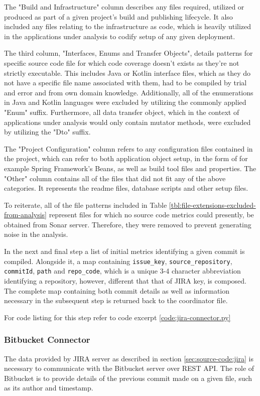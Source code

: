 The "Build and Infrastructure" column describes any files required, utilized or produced as part of a given project's build and publishing lifecycle. It also included any files relating to the infrastructure as code, which is heavily utilized in the applications under analysis to codify setup of any given deployment.

The third column, "Interfaces, Enums and Transfer Objects", details patterns for specific source code file for which code coverage doesn't exists as they're not strictly executable. This includes Java or Kotlin interface files, which as they do not have a specific file name associated with them, had to be compiled by trial and error and from own domain knowledge. Additionally, all of the enumerations in Java and Kotlin languages were excluded by utilizing the commonly applied "Enum" suffix. Furthermore, all data transfer object, which in the context of applications under analysis would only contain mutator methods, were excluded by utilizing the "Dto" suffix. 

The "Project Configuration" column refers to any configuration files contained in the project, which can refer to both application object setup, in the form of for example Spring Framework's Beans, as well as build tool files and properties. 
The "Other" column contains all of the files that did not fit any of the above categories. It represents the readme files, database scripts and other setup files.

To reiterate, all of the file patterns included in Table \ref{tbl:file-extensions-excluded-from-analysis} represent files for which no source code metrics could presently, be obtained from Sonar server. Therefore, they were removed to prevent generating noise in the analysis.
    
In the next and final step a list of initial metrics identifying a given commit is compiled. Alongside it, a map containing \texttt{issue\_key}, \texttt{source\_repository}, \texttt{commitId}, \texttt{path} and \texttt{repo\_code}, which is a unique 3-4 character abbreviation identifying a repository, however, different that that of JIRA key, is composed. The complete map containing both commit details as well as information necessary in the subsequent step is returned back to the coordinator file. 
    
For code listing for this step refer to code excerpt \ref{code:jira-connector.py}

\subsubsection{Bitbucket Connector}\label{sec:source-code:bitbucket}
The data provided by JIRA server as described in section \ref{sec:source-code:jira} is necessary to communicate with the Bitbucket server over REST API. The role of Bitbucket is to provide details of the previous commit made on a given file, such as its author and timestamp. 

